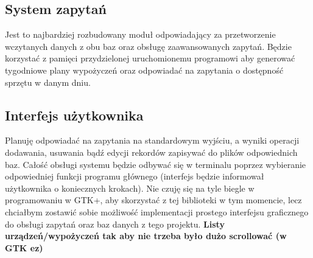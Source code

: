 \documentclass[a4paper]{article}
\begin{document}
\subsection{System zapytań}
Jest to najbardziej rozbudowany moduł odpowiadający za przetworzenie wczytanych danych z obu baz oraz obsługę zaawansowanych zapytań.
Będzie korzystać z pamięci przydzielonej uruchomionemu programowi aby generować tygodniowe plany wypożyczeń oraz odpowiadać na zapytania o dostępność sprzętu w danym dniu.

\subsection{Interfejs użytkownika}

Planuję odpowiadać na zapytania na standardowym wyjściu, a wyniki operacji dodawania, usuwania bądź edycji rekordów zapisywać do plików odpowiednich baz.
Całość obsługi systemu będzie odbywać się w terminalu poprzez wybieranie odpowiedniej funkcji programu głównego (interfejs będzie informował użytkownika o koniecznych krokach).
Nie czuję się na tyle biegle w programowaniu w GTK+, aby skorzystać z tej biblioteki w tym momencie, lecz chciałbym zostawić sobie możliwość implementacji prostego interfejsu graficznego do obsługi zapytań oraz baz danych z tego projektu. \textbf{Listy urządzeń/wypożyczeń tak aby nie trzeba było dużo scrollować (w GTK ez)}
\end{document}

